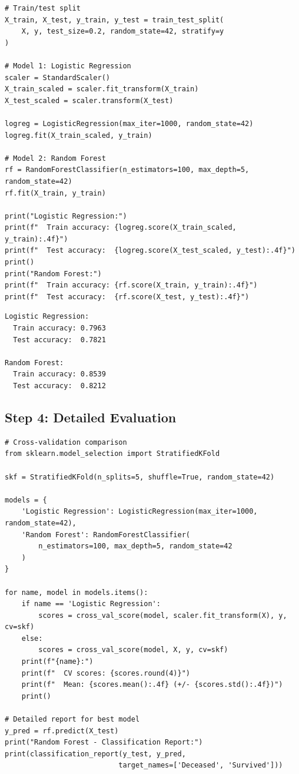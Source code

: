 \begin{codeblock}[title=\textbf{Python}]
\begin{verbatim}
# Train/test split
X_train, X_test, y_train, y_test = train_test_split(
    X, y, test_size=0.2, random_state=42, stratify=y
)

# Model 1: Logistic Regression
scaler = StandardScaler()
X_train_scaled = scaler.fit_transform(X_train)
X_test_scaled = scaler.transform(X_test)

logreg = LogisticRegression(max_iter=1000, random_state=42)
logreg.fit(X_train_scaled, y_train)

# Model 2: Random Forest
rf = RandomForestClassifier(n_estimators=100, max_depth=5, random_state=42)
rf.fit(X_train, y_train)

print("Logistic Regression:")
print(f"  Train accuracy: {logreg.score(X_train_scaled, y_train):.4f}")
print(f"  Test accuracy:  {logreg.score(X_test_scaled, y_test):.4f}")
print()
print("Random Forest:")
print(f"  Train accuracy: {rf.score(X_train, y_train):.4f}")
print(f"  Test accuracy:  {rf.score(X_test, y_test):.4f}")
\end{verbatim}
\end{codeblock}

\begin{codeoutput}
\begin{verbatim}
Logistic Regression:
  Train accuracy: 0.7963
  Test accuracy:  0.7821

Random Forest:
  Train accuracy: 0.8539
  Test accuracy:  0.8212
\end{verbatim}
\end{codeoutput}

\subsection{Step 4: Detailed Evaluation}

\begin{codeblock}[title=\textbf{Python}]
\begin{verbatim}
# Cross-validation comparison
from sklearn.model_selection import StratifiedKFold

skf = StratifiedKFold(n_splits=5, shuffle=True, random_state=42)

models = {
    'Logistic Regression': LogisticRegression(max_iter=1000, random_state=42),
    'Random Forest': RandomForestClassifier(
        n_estimators=100, max_depth=5, random_state=42
    )
}

for name, model in models.items():
    if name == 'Logistic Regression':
        scores = cross_val_score(model, scaler.fit_transform(X), y, cv=skf)
    else:
        scores = cross_val_score(model, X, y, cv=skf)
    print(f"{name}:")
    print(f"  CV scores: {scores.round(4)}")
    print(f"  Mean: {scores.mean():.4f} (+/- {scores.std():.4f})")
    print()

# Detailed report for best model
y_pred = rf.predict(X_test)
print("Random Forest - Classification Report:")
print(classification_report(y_test, y_pred,
                           target_names=['Deceased', 'Survived']))
\end{verbatim}
\end{codeblock}


